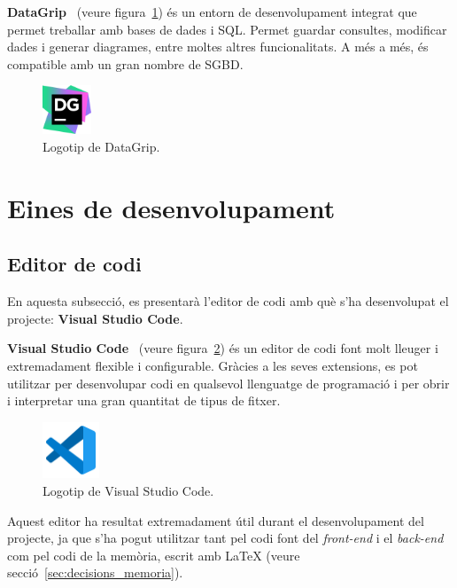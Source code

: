 \documentclass[a4paper,12pt]{ThesisStyle}
\begin{document}
\textbf{DataGrip}~\cite{DataGrip} (veure figura~\ref{img:logo_datagrip}) és un entorn de desenvolupament integrat que permet treballar amb bases de dades i SQL. Permet guardar consultes, modificar dades i generar diagrames, entre moltes altres funcionalitats. A més a més, és compatible amb un gran nombre de SGBD.

\begin{figure}[H]
  \centering
  \includegraphics[width=0.13\textwidth]{assets/logos/DataGrip.png}
  \caption{\label{img:logo_datagrip}Logotip de DataGrip.}
\end{figure}

\section{Eines de desenvolupament}
\label{sec:decisions_desenvolupament}

\subsection{Editor de codi}
\label{subsec:decisions_desenvolupament_editor}

En aquesta subsecció, es presentarà l'editor de codi amb què s'ha desenvolupat el projecte: \textbf{Visual Studio Code}.

\textbf{Visual Studio Code}~\cite{VSCode} (veure figura~\ref{img:logo_vscode}) és un editor de codi font molt lleuger i extremadament flexible i configurable. Gràcies a les seves extensions, es pot utilitzar per desenvolupar codi en qualsevol llenguatge de programació i per obrir i interpretar una gran quantitat de tipus de fitxer.

\begin{figure}[H]
  \centering
  \includegraphics[width=0.15\textwidth]{assets/logos/VSCode.png}
  \caption{\label{img:logo_vscode}Logotip de Visual Studio Code.}
\end{figure}

Aquest editor ha resultat extremadament útil durant el desenvolupament del projecte, ja que s'ha pogut utilitzar tant pel codi font del \textit{front-end} i el \textit{back-end} com pel codi de la memòria, escrit amb LaTeX (veure secció~\ref{sec:decisions_memoria}).
\end{document}
